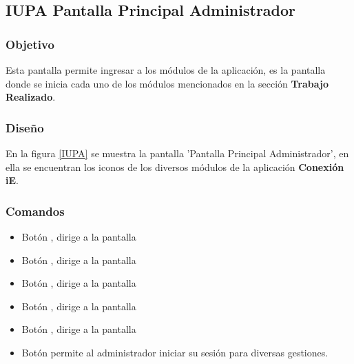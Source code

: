 \subsection{IUPA Pantalla Principal Administrador}

\subsubsection{Objetivo}

	
 	Esta pantalla permite ingresar a los módulos de la aplicación, es la pantalla donde se inicia cada uno de los módulos mencionados en la sección \textbf{Trabajo Realizado}.
\subsubsection{Diseño}


    En la figura \ref{IUPA} se muestra la pantalla 'Pantalla Principal Administrador', en ella se encuentran los iconos de los diversos módulos de la aplicación \textbf{Conexión iE}.



\subsubsection{Comandos}
\begin{itemize}
	
	\item Botón \botSalones, dirige a la pantalla 
	\item Botón \botProfesores, dirige a la pantalla 
	\item Botón \botUnidades, dirige a la pantalla 
	\item Botón \botMovilidad, dirige a la pantalla 
	\item Botón \botCursos, dirige a la pantalla 
	\item Botón  permite al administrador iniciar su sesión para diversas gestiones.
\end{itemize}

